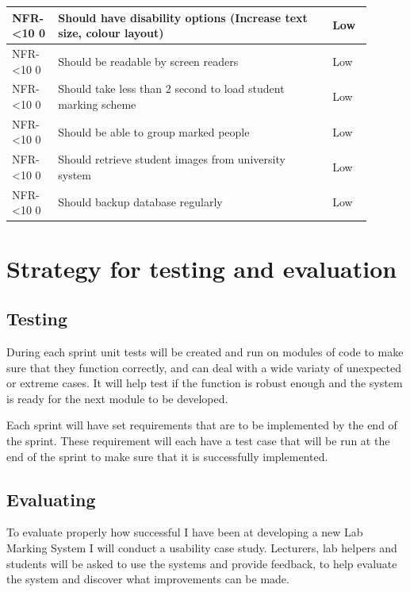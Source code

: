 \documentclass[12pt]{article}  %
\newcommand{\rid}[1]{\centering #1-\ifnum\value{requirement}<10 0\fi\arabic{requirement} \stepcounter{requirement}}
\begin{document}
\begin{spacing}{1.5}
\begin{longtable}{|p{0.1\linewidth}|p{0.7\linewidth}|p{0.1\linewidth}|}
\rid{NFR} & Should have disability options (Increase text size, colour layout) & Low\\ \hline
\rid{NFR} & Should be readable by screen readers & Low\\ \hline
\rid{NFR} & Should take less than 2 second to load student marking scheme & Low\\ \hline
\rid{NFR} & Should be able to group marked people & Low \\ \hline
\rid{NFR} & Should retrieve student images from university system & Low\\ \hline
\rid{NFR} & Should backup database regularly & Low\\ \hline


\end{longtable}
\end{spacing}


\setcounter{requirement}{1}




\newpage


\section{Strategy for testing and evaluation}


\subsection{Testing}
During each sprint unit tests will be created and run on modules of code to make sure that they function correctly, and can deal with a wide variaty of unexpected or extreme cases. It will help test if the function is robust enough  and the system is ready for the next module to be developed.

Each sprint will have set requirements that are to be implemented by the end of the sprint. These requirement will each have a test case that will be run at the end of the sprint to make sure that it is successfully implemented.


\subsection{Evaluating}
To evaluate properly how successful I have been at developing a new Lab Marking System I will conduct a usability case study. Lecturers, lab helpers and students will be asked to use the systems and provide feedback, to help evaluate the system and discover what improvements can be made.
\end{document}
